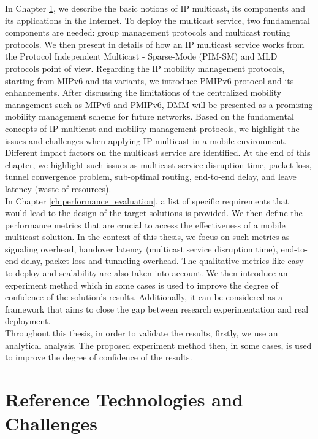 \documentclass[a4paper,10pt,twoside]{ThesisStyle}
\begin{document}
In Chapter \ref{ch:reference_technologies}, we describe the basic notions of IP multicast, its components and its applications in the Internet. To deploy the multicast service, two fundamental components are needed: group management protocols and multicast routing protocols. We then present in details of how an IP multicast service works from the Protocol Independent Multicast - Sparse-Mode (PIM-SM) and MLD protocols point of view. Regarding the IP mobility management protocols, starting from MIPv6 and its variants, we introduce PMIPv6 protocol and its enhancements. After discussing the limitations of the centralized mobility management such as MIPv6 and PMIPv6, DMM will be presented as a promising mobility management scheme for future networks. Based on the fundamental concepts of IP multicast and mobility management protocols, we highlight the issues and challenges when applying IP multicast in a mobile environment. Different impact factors on the multicast service are identified. At the end of this chapter, we highlight such issues as multicast service disruption time, packet loss, tunnel convergence problem, sub-optimal routing, end-to-end delay, and leave latency (waste of resources). \\

In Chapter \ref{ch:performance_evaluation}, a list of specific requirements that would lead to the design of the target solutions is provided. We then define the performance metrics that are crucial to access the effectiveness of a mobile multicast solution. In the context of this thesis, we focus on such metrics as signaling overhead, handover latency (multicast service disruption time), end-to-end delay, packet loss and tunneling overhead. The qualitative metrics like easy-to-deploy and scalability are also taken into account. We then introduce an experiment method which in some cases is used to improve the degree of confidence of the solution's results. Additionally, it can be considered as a framework that aims to close the gap between research experimentation and real deployment. \\

Throughout this thesis, in order to validate the results, firstly, we use an analytical analysis. The proposed experiment method then, in some cases, is used to improve the degree of confidence of the results.

\chapter{Reference Technologies and Challenges}
\label{ch:reference_technologies}
 
\end{document}
